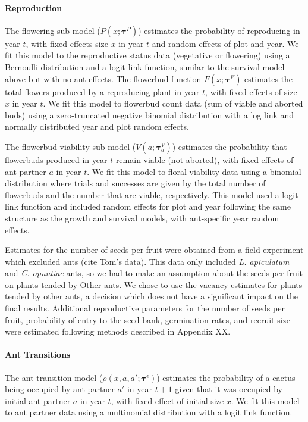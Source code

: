 \documentclass[11pt]{article}
\begin{document}
\paragraph{Reproduction}
The flowering sub-model ($P(x;\pmb{\tau}^{P})$) estimates the probability of reproducing in year $t$, with fixed effects size $x$ in year $t$ and random effects of plot and year.
We fit this model to the reproductive status data (vegetative or flowering) using a Bernoulli distribution and a logit link function, similar to the survival model above but with no ant effects.  
The flowerbud function $F(x;\pmb{\tau}^{F})$ estimates the total flowers produced by a reproducing plant in year $t$, with fixed effects of size $x$ in year $t$. 
We fit this model to flowerbud count data (sum of viable and aborted buds) using a zero-truncated negative binomial distribution with a log link and normally distributed year and plot random effects.

The flowerbud viability sub-model ($V(a;\pmb{\tau}^{V}_{a})$) estimates the probability that flowerbuds produced in year $t$ remain viable (not aborted), with fixed effects of ant partner $a$ in year $t$.
We fit this model to floral viability data using a binomial distribution where trials and successes are given by the total number of flowerbuds and the number that are viable, respectively.
This model used a logit link function and included random effects for plot and year following the same structure as the growth and survival models, with ant-specific year random effects. 

Estimates for the number of seeds per fruit were obtained from a field experiment which excluded ants (cite Tom's data).
This data only included  \textit{L. apiculatum} and \textit{C. opuntiae} ants, so we had to make an assumption about the seeds per fruit on plants tended by Other ants.
We chose to use the vacancy estimates for plants tended by other ants, a decision which does not have a significant impact on the final results. 
Additional reproductive parameters for the number of seeds per fruit, probability of entry to the seed bank, germination rates, and recruit size were estimated following methods described in Appendix XX.


\paragraph{Ant Transitions}
The ant transition model ($\rho(x,a,a';\pmb{\tau}^{\epsilon})$) estimates the probability of a cactus being occupied by ant partner $a'$ in year $t+1$ given that it was occupied by initial ant partner $a$  in year $t$, with fixed effect of initial size $x$.
We fit this model to ant partner data using a multinomial distribution with a logit link function. 
\end{document}
